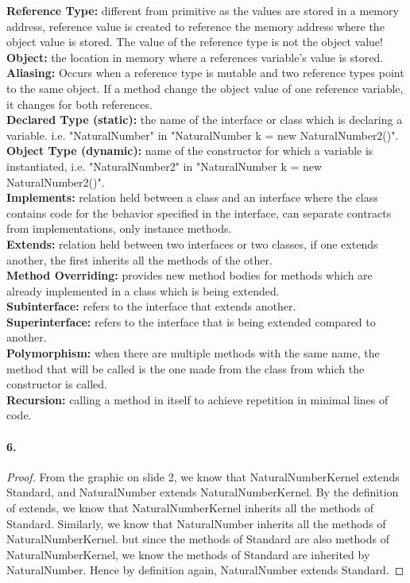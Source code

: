 \documentclass[10pt]{article}
\begin{document}
\textbf{Reference Type: } different from primitive as the values are stored in a memory address, reference value is created to reference the memory address where the object value is stored. The value of the reference type is not the object value! \\
\textbf{Object: } the location in memory where a references variable's value is stored. \\
\textbf{Aliasing: } Occurs when a reference type is mutable and two reference types point to the same object. If a method change the object value of one reference variable, it changes for both references.\\
\textbf{Declared Type (static): } the name of the interface or class which is declaring a variable. i.e. "NaturalNumber" in "NaturalNumber k = new NaturalNumber2()". \\
\textbf{Object Type (dynamic): } name of the constructor for which a variable is instantiated, i.e. "NaturalNumber2" in "NaturalNumber k = new NaturalNumber2()". \\
\textbf{Implements: } relation held between a class and an interface where the class contains code for the behavior specified in the interface, can separate contracts from implementations, only instance methods. \\
\textbf{Extends: } relation held between two interfaces or two classes, if one extends another, the first inherits all the methods of the other. \\
\textbf{Method Overriding: } provides new method bodies for methods which are already implemented in a class which is being extended. \\
\textbf{Subinterface: } refers to the interface that extends another. \\
\textbf{Superinterface:} refers to the interface that is being extended compared to another. \\
\textbf{Polymorphism: } when there are multiple methods with the same name, the method that will be called is the one made from the class from which the constructor is called. \\
\textbf{Recursion: } calling a method in itself to achieve repetition in minimal lines of code. \\



\vspace{1000mm}
\paragraph{6. } \begin{proof} From the graphic on slide 2, we know that NaturalNumberKernel extends Standard, and NaturalNumber extends NaturalNumberKernel. By the definition of extends, we know that NaturalNumberKernel inherits all the methods of Standard. Similarly, we know that NaturalNumber inherits all the methods of NaturalNumberKernel. but since the methods of Standard are also methods of NaturalNumberKernel, we know the methods of Standard are inherited by NaturalNumber. Hence by definition again, NaturalNumber extends Standard. 
\end{proof}
\end{document}
